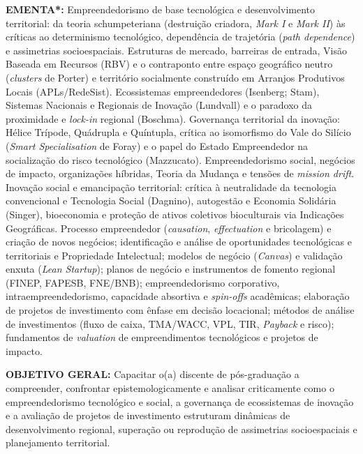 \documentclass[11pt,a4paper]{article}
\begin{document}
\noindent\textbf{EMENTA*:} Empreendedorismo de base tecnológica e desenvolvimento territorial: da teoria schumpeteriana (destruição criadora, \textit{Mark I} e \textit{Mark II}) às críticas ao determinismo tecnológico, dependência de trajetória (\textit{path dependence}) e assimetrias socioespaciais. Estruturas de mercado, barreiras de entrada, Visão Baseada em Recursos (RBV) e o contraponto entre espaço geográfico neutro (\textit{clusters} de Porter) e território socialmente construído em Arranjos Produtivos Locais (APLs/RedeSist). Ecossistemas empreendedores (Isenberg; Stam), Sistemas Nacionais e Regionais de Inovação (Lundvall) e o paradoxo da proximidade e \textit{lock-in} regional (Boschma). Governança territorial da inovação: Hélice Trípode, Quádrupla e Quíntupla, crítica ao isomorfismo do Vale do Silício (\textit{Smart Specialisation} de Foray) e o papel do Estado Empreendedor na socialização do risco tecnológico (Mazzucato). Empreendedorismo social, negócios de impacto, organizações híbridas, Teoria da Mudança e tensões de \textit{mission drift}. Inovação social e emancipação territorial: crítica à neutralidade da tecnologia convencional e Tecnologia Social (Dagnino), autogestão e Economia Solidária (Singer), bioeconomia e proteção de ativos coletivos bioculturais via Indicações Geográficas. Processo empreendedor (\textit{causation}, \textit{effectuation} e bricolagem) e criação de novos negócios; identificação e análise de oportunidades tecnológicas e territoriais e Propriedade Intelectual; modelos de negócio (\textit{Canvas}) e validação enxuta (\textit{Lean Startup}); planos de negócio e instrumentos de fomento regional (FINEP, FAPESB, FNE/BNB); empreendedorismo corporativo, intraempreendedorismo, capacidade absortiva e \textit{spin-offs} acadêmicas; elaboração de projetos de investimento com ênfase em decisão locacional; métodos de análise de investimentos (fluxo de caixa, TMA/WACC, VPL, TIR, \textit{Payback} e risco); fundamentos de \textit{valuation} de empreendimentos tecnológicos e projetos de impacto.

\vspace{8pt}
\noindent\textbf{OBJETIVO GERAL:} Capacitar o(a) discente de pós-graduação a compreender, confrontar epistemologicamente e analisar criticamente como o empreendedorismo tecnológico e social, a governança de ecossistemas de inovação e a avaliação de projetos de investimento estruturam dinâmicas de desenvolvimento regional, superação ou reprodução de assimetrias socioespaciais e planejamento territorial.
\end{document}
